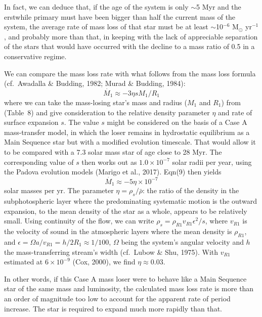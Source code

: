 \documentclass[useAMS,usenatbib]{mnras}                                                                           \usepackage[pdftex]{graphicx}
\begin{document}
{ In fact, we can deduce that, if the age of the system is only $\sim$5 Myr and the erstwhile
 primary must have been bigger than half the current mass of the system,
 the average rate of mass loss of that star must be at least $\sim$10$^{-6}$ M$_{\odot}$ 
 yr$^{-1}$, and probably more than that, in keeping with the
 lack of appreciable separation of the stars that would have occurred
 with the decline to a mass ratio of 0.5 in a conservative regime. 
    
We can compare the mass loss rate with what follows from 
the mass loss formula
(cf.\ Awadalla \& Budding, 1982; Murad \& Budding, 1984):
\begin{equation}
\dot{M_1} \approx -3\eta s M_1/R_1 
\end{equation}
where we can take the mass-losing star's mass and radius ($M_1$ and $R_1$)
from (Table~8) and give consideration to the relative density parameter $\eta$ and 
rate of surface expansion $s$.
  The value $s$ might be considered 
on the basis of a Case A mass-transfer model, 
in which the loser remains in hydrostatic equilibrium
as a Main Sequence star but with a modified evolution timescale.
That would allow it to be compared with a 7.3 solar mass star of age close to 28 Myr.
The corresponding value of $s$ then 
works out as $1.0\times 10^{-7}$ solar radii per year,
using the Padova evolution models  (Marigo et al., 2017). Eqn(9) then yields 
\begin{equation}
\dot{M_1} \approx -5\eta \times 10^{-7} 
\end{equation}
solar masses per yr.
The parameter $\eta =  \rho_s/\bar{\rho}$:
 the ratio of the density in the subphotospheric layer
 where the predominating systematic motion is the outward expansion,
 to the mean density of the star as a whole,
appears to be relatively small.  Using continuity of the flow, we can write 
$\rho_s = \rho_{R1} v_{R1} \epsilon^2/s$, where $v_{R1}$ is the velocity of sound in
the atmospheric layers where the mean density is $\rho_{R1}$, and 
$\epsilon = \Omega a/ v_{R1} = h/2R_1 \approx 1/100$, $\Omega$ being the 
system's angular velocity and $h$ the mass-transferring
stream's width (cf.\ Lubow \& Shu, 1975). 
With  $v_{R1}$ estimated at $6 \times 10^{-9}$ (Cox, 2000), 
we find $\eta \approx 0.03$.  
 
 In other words,  if this Case A mass loser were to
 behave like a Main Sequence star of the same mass and luminosity,
 the calculated mass loss rate  
 is more than an order of magnitude too low to account for the 
 apparent rate of period increase.
The star is required to expand much more rapidly than that.

}
\end{document}
